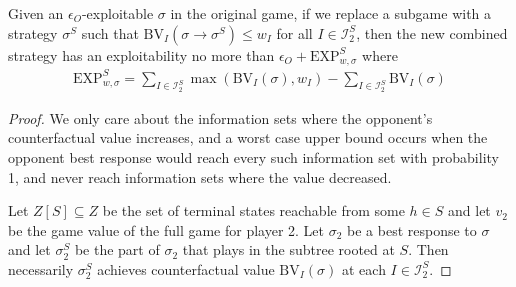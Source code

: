 \begin{lemma}
  Given an $\epsilon_O$-exploitable $\sigma$ in the original game, if
  we replace a subgame with a strategy $\sigma^S$ such that
  $\text{BV}_I(\sigma \to \sigma^S) \le w_I$ for all $I \in \mathcal{I}^S_2$, then the new combined
  strategy has an exploitability no more than $\epsilon_O + \text{EXP}^S_{w,\sigma}$ where
  \begin{align*}
    \text{EXP}^S_{w,\sigma} = \sum_{I \in \mathcal{I}^S_2} \max( \text{BV}_I( \sigma ), w_I ) - \sum_{I \in \mathcal{I}^S_2} \text{BV}_I( \sigma )
  \end{align*}
  \label{lem:error}
\end{lemma}
\begin{proof}
  We only care about the information sets where the opponent's
  counterfactual value increases, and a worst case upper bound occurs
  when the opponent best response would reach every such information
  set with probability 1, and never reach information sets where the
  value decreased.

Let $Z[S] \subseteq Z$ be the set of terminal states reachable from some $h \in S$ and let $v_2$ be the game value of the full game for player 2. Let $\sigma_2$ be a best response to $\sigma$ and let $\sigma^S_2$ be the part of $\sigma_2$ that plays in the subtree rooted at $S$. Then necessarily $\sigma^S_2$ achieves counterfactual value $\text{BV}_I(\sigma)$ at each $I \in \mathcal{I}^S_2$.


\end{proof}
